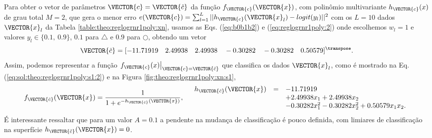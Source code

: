 \begin{SolutionT}\label{sol:theo:reglogrnr1poly:s1}
Para obter o vetor de parâmetros $\VECTOR{c}=\VECTOR{\hat{c}}$ da função $f_{\VECTOR{c}}(\VECTOR{x})$, 
com polinômio multivariante $h_{\VECTOR{c}}(x)$ de grau total $M=2$,
que gera o menor erro $e(\VECTOR{c}) =  \sum_{l=1}^{L} ||h_{\VECTOR{c}}(\VECTOR{x}_l)-logit(y_l)||^2$
com os $L=10$ dados $\VECTOR{x}_l$ da Tabela \ref{table:theo:reglogrnr1poly:xn},
usamos as Eqs. (\ref{eq:b0b1b2}) e  (\ref{eq:reglogrnr1poly:2}) onde escolhemos $w_l=1$ e valores $y_l \in \{0.1,~ 0.9\}$,
$0.1$ para $\bigtriangleup$ e $0.9$ para $\bigcirc$, 
obtendo um vetor 
\begin{equation}
\VECTOR{\hat{c}}=[-11.71919\quad 2.49938\quad 2.49938\quad -0.30282\quad -0.30282\quad 0.50579]^{\transpose}.
\end{equation}
Assim, podemos representar a função $\left.f_{\VECTOR{c}}(x)\right|_{\VECTOR{c}=\VECTOR{\hat{c}}}$ 
que classifica os dados $\VECTOR{x}_l$, 
como é mostrado na Eq. (\ref{eq:sol:theo:reglogrnr1poly:s1:2}) e na Figura \ref{fig:theo:reglogrnr1poly:xn:s1},
\begin{equation}\label{eq:sol:theo:reglogrnr1poly:s1:2}
f_{\VECTOR{\hat{c}}}(\VECTOR{x})= \frac{1}{1+e^{-h_{\VECTOR{\hat{c}}}(\VECTOR{x})}},
\quad
\begin{array}{lll}
h_{\VECTOR{\hat{c}}}(\VECTOR{x}) & = & -11.71919\\
                         ~ & ~ & +2.49938 x_1 +2.49938 x_2 \\
                         ~ & ~ & -0.30282 x_1^2 -0.30282  x_2^2 + 0.50579 x_1 x_2.
\end{array}
\end{equation}
É interessante ressaltar que para um valor $A=0.1$ a pendente na mudança de classificação é pouco definida,
com limiares de classificação na superfície $h_{\VECTOR{\hat{c}}}(\VECTOR{x})=0$.
\end{SolutionT}

